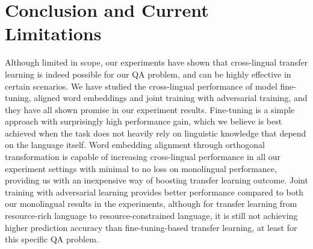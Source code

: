 \documentclass[]{article}
\begin{document}
\section{Conclusion and Current Limitations}

Although limited in scope, our experiments have shown that cross-lingual transfer learning is indeed possible for our QA problem, and can be highly effective in certain scenarios. We have studied the cross-lingual performance of model fine-tuning, aligned word embeddings and joint training with adversarial training, and they have all shown promise in our experiment results. Fine-tuning is a simple approach with surprisingly high performance gain, which we believe is best achieved when the task does not heavily rely on linguistic knowledge that depend on the language itself. Word embedding alignment through orthogonal transformation is capable of increasing cross-lingual performance in all our experiment settings with minimal to no loss on monolingual performance, providing us with an inexpensive way of boosting transfer learning outcome. Joint training with adversarial learning provides better performance compared to both our monolingual results in the experiments, although for transfer learning from resource-rich language to resource-constrained language, it is still not achieving higher prediction accuracy than fine-tuning-based transfer learning, at least for this specific QA problem.
\end{document}

